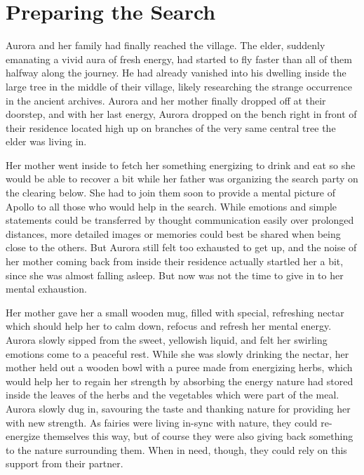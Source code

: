 \chapter{Preparing the Search}
\label{cha:preparing-the-search}
Aurora and her family had finally reached the village. The elder, suddenly emanating a vivid aura of fresh energy, had started to fly faster than all of them halfway along the journey. He had already vanished into his dwelling inside the large tree in the middle of their village, likely researching the strange occurrence in the ancient archives. Aurora and her mother finally dropped off at their doorstep, and with her last energy, Aurora dropped on the bench right in front of their residence located high up on branches of the very same central tree the elder was living in.

Her mother went inside to fetch her something energizing to drink and eat so she would be able to recover a bit while her father was organizing the search party on the clearing below. She had to join them soon to provide a mental picture of Apollo to all those who would help in the search. While emotions and simple statements could be transferred by thought communication easily over prolonged distances, more detailed images or memories could best be shared when being close to the others. But Aurora still felt too exhausted to get up, and the noise of her mother coming back from inside their residence actually startled her a bit, since she was almost falling asleep. But now was not the time to give in to her mental exhaustion.

Her mother gave her a small wooden mug, filled with special, refreshing nectar which should help her to calm down, refocus and refresh her mental energy. Aurora slowly sipped from the sweet, yellowish liquid, and felt her swirling emotions come to a peaceful rest. While she was slowly drinking the nectar, her mother held out a wooden bowl with a puree made from energizing herbs, which would help her to regain her strength by absorbing the energy nature had stored inside the leaves of the herbs and the vegetables which were part of the meal. Aurora slowly dug in, savouring the taste and thanking nature for providing her with new strength. As fairies were living in-sync with nature, they could re-energize themselves this way, but of course they were also giving back something to the nature surrounding them. When in need, though, they could rely on this support from their partner.

\fancybreaker{}

